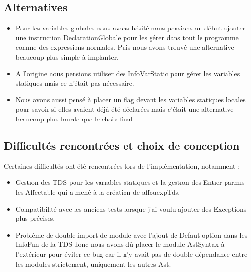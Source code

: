 \documentclass[a4paper,12pt]{article}
\begin{document}
\subsection{Alternatives}
\begin{itemize}
\item Pour les variables globales nous avons hésité nous pensions au début ajouter une instruction DeclarationGlobale pour les gérer dans tout le programme comme des expressions normales. Puis nous avons trouvé une alternative beaucoup plus simple à implanter.

\item A l'origine nous pensions utiliser des InfoVarStatic pour gérer les variables statiques mais ce n'était pas nécessaire.
\item Nous avons aussi pensé à placer un flag devant les variables statiques locales pour savoir si elles avaient déjà été déclarées mais c'était une alternative beaucoup plus lourde que le choix final.

\end{itemize}

\subsection{Difficult\'es rencontr\'ees et choix de conception}
Certaines difficult\'es ont \'et\'e rencontr\'ees lors de l'impl\'ementation, notamment :
\begin{itemize}
    \item Gestion des TDS pour les variables statiques et la gestion des Entier parmis les Affectable qui a mené à la création de affouexpTds.
    \item Compatibilit\'e avec les anciens tests lorsque j'ai voulu ajouter des Exceptions plus précises.
    \item Problème de double import de module avec l'ajout de Defaut option dans les InfoFun de la TDS donc nous avons dû placer le module AstSyntax à l'extérieur pour éviter ce bug car il n'y avait pas de double dépendance entre les modules strictement, uniquement les autres Ast.
\end{itemize}
\end{document}
